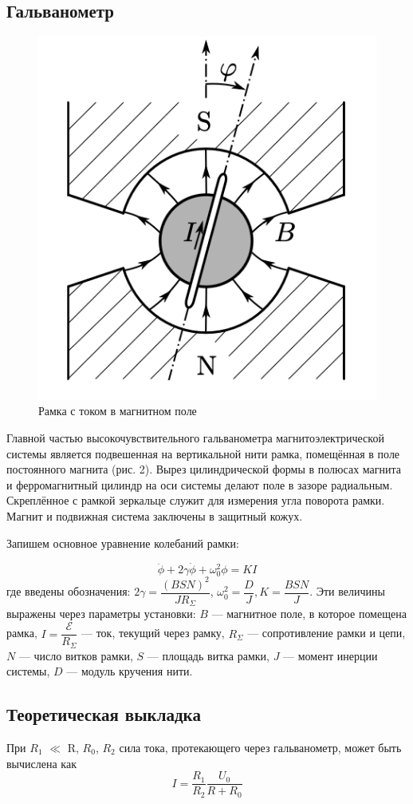 \documentclass[a4paper,12pt]{article} %
\begin{document}
\subsection{Гальванометр}
\begin{figure}[h!]
    \centering
    \includegraphics[width=0.3\linewidth]{Galvanometr.png}
    \caption{Рамка с током в магнитном поле}
    \label{fig:enter-label}
\end{figure}
\begin{raggedright}
Главной частью высокочувствительного гальванометра магнитоэлектрической системы является подвешенная на вертикальной нити рамка, помещённая в поле постоянного магнита (рис. 2). Вырез цилиндрической формы в полюсах магнита и ферромагнитный цилиндр на оси системы делают поле в зазоре радиальным. Скреплённое с рамкой зеркальце служит для измерения угла поворота рамки. Магнит и подвижная система заключены в защитный кожух.
\end{raggedright}
\begin{centering}
Запишем основное уравнение колебаний рамки:
\end{centering}
\begin{equation}\label{main}
\ddot{\phi} + 2\gamma\dot{\phi }+ \omega_0^2\phi = K I
\end{equation}
где введены обозначения: $ 2\gamma = \dfrac{(BSN)^2}{JR_\Sigma} $, $ \omega_0^2 = \dfrac{D}{J}, K = \dfrac{BSN}{J} $. Эти величины выражены через параметры установки: $ B $ --- магнитное поле, в которое помещена рамка, $ I  = \dfrac{\mathcal{E}}{R_\Sigma}$ --- ток, текущий через рамку, $ R_\Sigma $ --- сопротивление рамки и цепи, $ N $ --- число витков рамки, $ S $ --- площадь витка рамки, $ J $ --- момент инерции системы, $ D $ --- модуль кручения нити.
	


\subsection{Теоретическая выкладка}
При $R_1$ $\ll$ R, $R_0$, $R_2$ сила тока, протекающего через гальванометр, может быть вычислена как
\begin{equation}
I = \frac{R_1}{R_2} \frac{U_0}{R+R_0}    
\end{equation}
\end{document}
